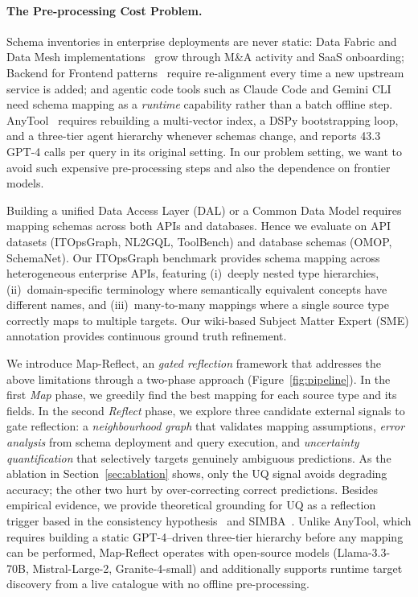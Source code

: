\documentclass[sigconf, nonacm]{acmart}
\begin{document}
\paragraph{The Pre-processing Cost Problem.}
Schema inventories in enterprise deployments are never static: Data Fabric and Data Mesh implementations~\cite{blohm2024data,dehghani2022datamesh} grow through M\&A activity and SaaS onboarding; Backend for Frontend patterns~\cite{richardson2018microservices} require re-alignment every time a new upstream service is added; and agentic code tools such as Claude Code and Gemini CLI need schema mapping as a \emph{runtime} capability rather than a batch offline step. AnyTool~\cite{anytool} requires rebuilding a multi-vector index, a DSPy bootstrapping loop, and a three-tier agent hierarchy whenever schemas change, and reports 43.3 GPT-4 calls per query in its original setting. In our problem setting, we want to avoid such expensive pre-processing steps and also the dependence on frontier models.

Building a unified Data Access Layer (DAL) or a Common Data Model requires mapping schemas across both APIs and databases. Hence we evaluate on API datasets (ITOpsGraph, NL2GQL, ToolBench) and database schemas (OMOP, SchemaNet). Our ITOpsGraph benchmark provides schema mapping across heterogeneous enterprise APIs, featuring (i)~deeply nested type hierarchies, (ii)~domain-specific terminology where semantically equivalent concepts have different names, and (iii)~many-to-many mappings where a single source type correctly maps to multiple targets. Our wiki-based Subject Matter Expert (SME) annotation provides continuous ground truth refinement.

We introduce Map-Reflect, an \emph{gated reflection} framework that addresses the above limitations through a two-phase approach (Figure~\ref{fig:pipeline}). In the first \emph{Map} phase, we greedily find the best mapping for each source type and its fields. In the second \emph{Reflect} phase, we explore three candidate external signals to gate reflection: a \emph{neighbourhood graph} that validates mapping assumptions, \emph{error analysis} from schema deployment and query execution, and \emph{uncertainty quantification} that selectively targets genuinely ambiguous predictions. As the ablation in Section~\ref{sec:ablation} shows, only the UQ signal avoids degrading accuracy; the other two hurt by over-correcting correct predictions. Besides empirical evidence, we provide theoretical grounding for UQ as a reflection trigger based in the consistency hypothesis~\cite{xiao2025consistency} and SIMBA~\cite{simba2025}. Unlike AnyTool, which requires building a static GPT-4--driven three-tier hierarchy before any mapping can be performed, Map-Reflect operates with open-source models (Llama-3.3-70B, Mistral-Large-2, Granite-4-small) and additionally supports runtime target discovery from a live catalogue with no offline pre-processing.
\end{document}
